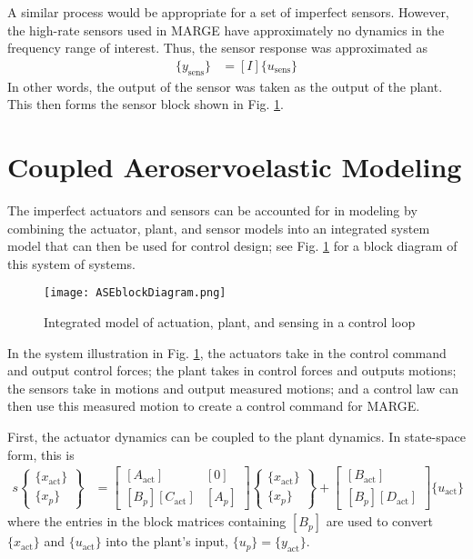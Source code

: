 A similar process would be appropriate for a set of imperfect sensors. However, the high-rate sensors used in MARGE have approximately no dynamics in the frequency range of interest. Thus, the sensor response was approximated as
\begin{align}
    \{y_\text{sens}\} &= [I] \{u_\text{sens}\}
\end{align}
In other words, the output of the sensor was taken as the output of the plant. This then forms the sensor block shown in Fig. \ref{fig:actPlantSens}.

\section{Coupled Aeroservoelastic Modeling} %

The imperfect actuators and sensors can be accounted for in modeling by combining the actuator, plant, and sensor models into an integrated system model that can then be used for control design; see Fig. \ref{fig:actPlantSens} for a block diagram of this system of systems.
\begin{figure}[h]
    \centering
    \texttt{[image: ASEblockDiagram.png]}
    \label{fig:actPlantSens}
    \caption{Integrated model of actuation, plant, and sensing in a control loop}
\end{figure}
In the system illustration in Fig. \ref{fig:actPlantSens}, the actuators take in the control command and output control forces; the plant takes in control forces and outputs motions; the sensors take in motions and output measured motions; and a control law can then use this measured motion to create a control command for MARGE.

First, the actuator dynamics can be coupled to the plant dynamics. In state-space form, this is
\begin{align}
	\label{eq:coupledState}
	s \begin{Bmatrix} \{x_\text{act}\} \\ \{x_p\} \end{Bmatrix} &= \begin{bmatrix}
		[A_\text{act}] & [0] \\
		[B_p] [C_\text{act}] & [A_p]
	\end{bmatrix} \begin{Bmatrix} \{x_\text{act}\} \\ \{x_p\} \end{Bmatrix}
	+ \begin{bmatrix} [B_\text{act}] \\ [B_p][D_\text{act}] \end{bmatrix} \{u_\text{act}\}
\end{align}
where the entries in the block matrices containing $[B_p]$ are used to convert $\{x_\text{act}\}$ and $\{u_\text{act}\}$ into the plant's input, $\{u_p\}=\{y_\text{act}\}$.

